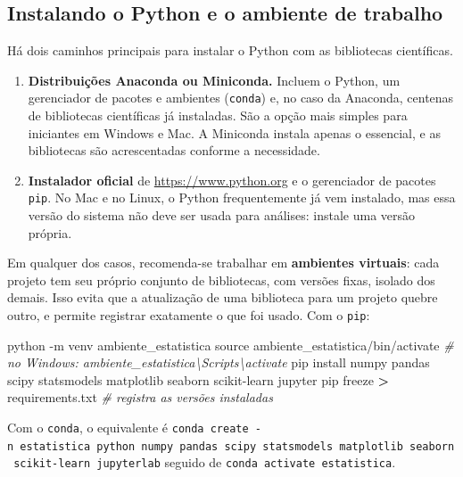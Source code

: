 \documentclass[
]{book}
\newenvironment{Shaded}{\begin{snugshade}}{\end{snugshade}}
\newcommand{\AttributeTok}[1]{\textcolor[rgb]{0.13,0.29,0.53}{#1}}
\newcommand{\BuiltInTok}[1]{#1}
\newcommand{\CommentTok}[1]{\textcolor[rgb]{0.56,0.35,0.01}{\textit{#1}}}
\newcommand{\ExtensionTok}[1]{#1}
\newcommand{\NormalTok}[1]{#1}
\newcommand{\OperatorTok}[1]{\textcolor[rgb]{0.81,0.36,0.00}{\textbf{#1}}}
\providecommand{\tightlist}{%
  \setlength{\itemsep}{0pt}\setlength{\parskip}{0pt}}
\begin{document}
\subsection{Instalando o Python e o ambiente de trabalho}\label{instalando-o-python-e-o-ambiente-de-trabalho}

Há dois caminhos principais para instalar o Python com as bibliotecas científicas.

\begin{enumerate}
\def\labelenumi{\arabic{enumi}.}
\tightlist
\item
  \textbf{Distribuições Anaconda ou Miniconda.} Incluem o Python, um gerenciador de pacotes e ambientes (\texttt{conda}) e, no caso da Anaconda, centenas de bibliotecas científicas já instaladas. São a opção mais simples para iniciantes em Windows e Mac. A Miniconda instala apenas o essencial, e as bibliotecas são acrescentadas conforme a necessidade.
\item
  \textbf{Instalador oficial} de \url{https://www.python.org} e o gerenciador de pacotes \texttt{pip}. No Mac e no Linux, o Python frequentemente já vem instalado, mas essa versão do sistema não deve ser usada para análises: instale uma versão própria.
\end{enumerate}

Em qualquer dos casos, recomenda-se trabalhar em \textbf{ambientes virtuais}: cada projeto tem seu próprio conjunto de bibliotecas, com versões fixas, isolado dos demais. Isso evita que a atualização de uma biblioteca para um projeto quebre outro, e permite registrar exatamente o que foi usado. Com o \texttt{pip}:

\begin{Shaded}
\begin{Highlighting}[]
\ExtensionTok{python} \AttributeTok{{-}m}\NormalTok{ venv ambiente\_estatistica}
\BuiltInTok{source}\NormalTok{ ambiente\_estatistica/bin/activate     }\CommentTok{\# no Windows: ambiente\_estatistica\textbackslash{}Scripts\textbackslash{}activate}
\ExtensionTok{pip}\NormalTok{ install numpy pandas scipy statsmodels matplotlib seaborn scikit{-}learn jupyter}
\ExtensionTok{pip}\NormalTok{ freeze }\OperatorTok{\textgreater{}}\NormalTok{ requirements.txt                }\CommentTok{\# registra as versões instaladas}
\end{Highlighting}
\end{Shaded}

Com o \texttt{conda}, o equivalente é \texttt{conda\ create\ -n\ estatistica\ python\ numpy\ pandas\ scipy\ statsmodels\ matplotlib\ seaborn\ scikit-learn\ jupyterlab} seguido de \texttt{conda\ activate\ estatistica}.
\end{document}
